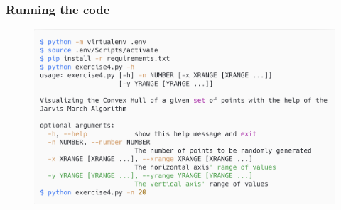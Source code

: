 \documentclass[12pt]{article}
\newenvironment{matlab}
	{\begin{figure}[hp]\centering\captionsetup{justification=centering}}
	{\end{figure}}
\begin{document}
\vspace{2in}

\subsubsection*{Running the code}

\begin{matlab}
    \includegraphics[scale=0.140]{images/exercise4.png}
\end{matlab}

\pagebreak
\end{document}
